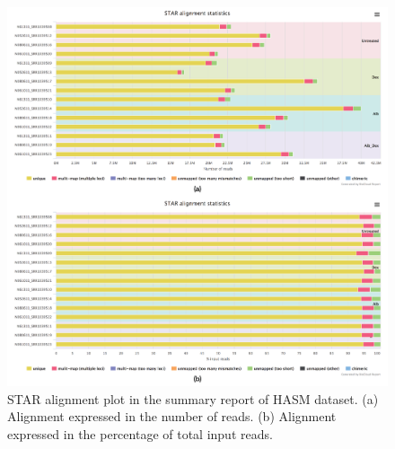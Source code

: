 \begin{figure}[!tb]
\centering
\includegraphics[width=1\textwidth]{images/report_align}
\caption[STAR alignment plot in summary report]{
    STAR alignment plot in the summary report of HASM dataset.
    (a) Alignment expressed in the number of reads.
    (b) Alignment expressed in the percentage of total input reads.
}
\label{fig:report-align}
\end{figure}
